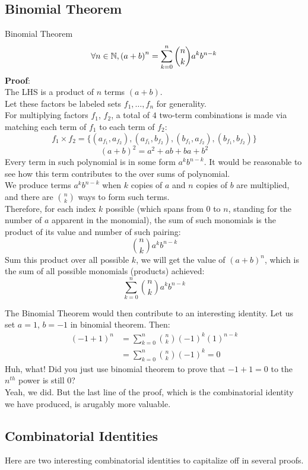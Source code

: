 \subsection{Binomial Theorem}
\begin{ln-theorem}{Binomial Theorem}{}
    \[\forall n \in \mathbb{N}, {(a + b)}^n = \sum_{k = 0}^n \binom{n}{k} a^k b^{n - k}\]
    \tcblower
    \textbf{Proof}: \\
    The LHS is a product of $n$ terms $(a + b)$. \\
    Let these factors be labeled sets $f_1, \dots, f_n$ for generality. \\
    For multiplying factors $f_1$, $f_2$, a total of $4$ two-term combinations is made via matching each term of $f_1$ to each term of $f_2$:
    \[f_1 \times f_2 = \{(a_{f_1}, a_{f_2}), (a_{f_1}, b_{f_2}), (b_{f_1}, a_{f_2}), (b_{f_1}, b_{f_2})\}\]
    \[(a + b)^2 = a^2 + ab + ba + b^2\]
    Every term in such polynomial is in some form $a^k b^{n - k}$. It would be reasonable to see how this term contributes to the over sums of polynomial. \\
    We produce terms $a^k b^{n - k}$ when $k$ copies of $a$ and $n$ copies of $b$ are multiplied, and there are $\binom{n}{k}$ ways to form such terms. \\
    Therefore, for each index $k$ possible (which spans from $0$ to $n$, standing for the number of $a$ apparent in the monomial), the sum of such monomials is the product of its value and number of such pairing:
    \[\binom{n}{k} a^k b^{n - k}\]
    Sum this product over all possible $k$, we will get the value of ${(a + b)}^n$, which is the sum of all possible monomials (products) achieved:
    \[\sum_{k = 0}^n \binom{n}{k} a^k b^{n - k}\]
\end{ln-theorem}

The Binomial Theorem would then contribute to an interesting identity. Let us set $a = 1$, $b = -1$ in binomial theorem. Then:
\begin{align*}
    (-1 + 1)^n
    &= \sum_{k = 0}^n \binom{n}{k} {(-1)}^k {(1)}^{n - k} \\
    &= \sum_{k = 0}^n \binom{n}{k} {(-1)}^k = 0
\end{align*}
Huh, what! Did you just use binomial theorem to prove that $-1 + 1 = 0$ to the $n^{th}$ power is still $0$? \\
Yeah, we did. But the last line of the proof, which is the combinatorial identity we have produced, is arugably more valuable.

\subsection{Combinatorial Identities}
Here are two interesting combinatorial identities to capitalize off in several proofs.

